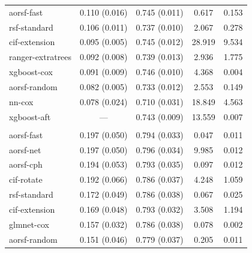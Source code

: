 \documentclass[twoside,11pt]{article}\usepackage[]{graphicx}\usepackage[]{xcolor}
\newenvironment{knitrout}{}{} %
\begin{document}
\begin{knitrout}
\begin{longtable}[t]{lcccc}
\hspace{1em}aorsf-fast & 0.110 (0.016) & 0.745 (0.011) & 0.617 & 0.153\\
\hspace{1em}rsf-standard & 0.106 (0.011) & 0.737 (0.010) & 2.067 & 0.278\\
\hspace{1em}cif-extension & 0.095 (0.005) & 0.745 (0.012) & 28.919 & 9.534\\
\hspace{1em}ranger-extratrees & 0.092 (0.008) & 0.739 (0.013) & 2.936 & 1.775\\
\hspace{1em}xgboost-cox & 0.091 (0.009) & 0.746 (0.010) & 4.368 & 0.004\\
\hspace{1em}aorsf-random & 0.082 (0.005) & 0.733 (0.012) & 2.553 & 0.149\\
\hspace{1em}nn-cox & 0.078 (0.024) & 0.710 (0.031) & 18.849 & 4.563\\
\hspace{1em}xgboost-aft & --- & 0.743 (0.009) & 13.559 & 0.007\\
\addlinespace[0.3em]
\multicolumn{5}{l}{\textit{\textbf{VA lung cancer trial; death, n = 137, p = 8}}}\\
\hline
\hspace{1em}aorsf-fast & 0.197 (0.050) & 0.794 (0.033) & 0.047 & 0.011\\
\hspace{1em}aorsf-net & 0.197 (0.050) & 0.796 (0.034) & 9.985 & 0.012\\
\hspace{1em}aorsf-cph & 0.194 (0.053) & 0.793 (0.035) & 0.097 & 0.012\\
\hspace{1em}cif-rotate & 0.192 (0.066) & 0.786 (0.037) & 4.248 & 1.059\\
\hspace{1em}rsf-standard & 0.172 (0.049) & 0.786 (0.038) & 0.067 & 0.025\\
\hspace{1em}cif-extension & 0.169 (0.048) & 0.793 (0.032) & 3.508 & 1.194\\
\hspace{1em}glmnet-cox & 0.157 (0.032) & 0.786 (0.038) & 0.078 & 0.002\\
\hspace{1em}aorsf-random & 0.151 (0.046) & 0.779 (0.037) & 0.205 & 0.011\\

\end{longtable}
\end{knitrout}
\end{document}

